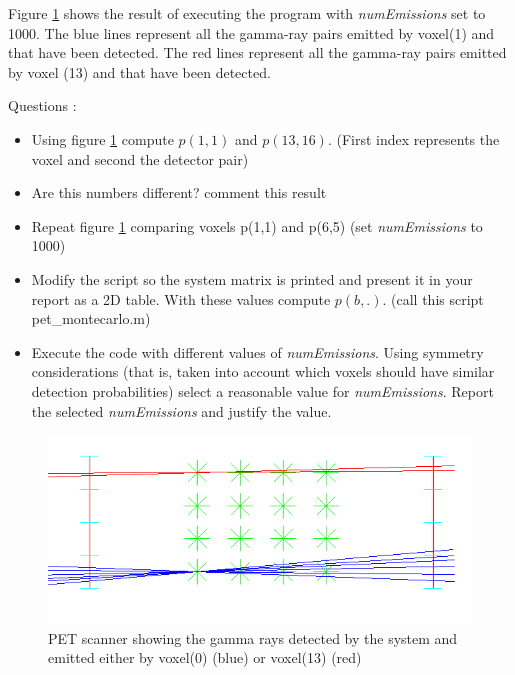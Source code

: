 \documentclass[12pt]{article} %
\newcounter{ejercicioNo}
\begin{document}
Figure \ref{fig:0_0vs0_3} shows the result of executing the program with \emph{numEmissions} set to 1000. The blue lines represent all the gamma-ray pairs emitted by voxel(1) and that have been detected. The red lines represent all the gamma-ray pairs emitted by voxel (13)  and that have been detected.\\

\begin{minipage}{\linewidth}
\begin{framed}
\addtocounter{ejercicioNo}{1} 
Questions : 
\begin{itemize}
   \item Using figure \ref{fig:0_0vs0_3} compute  $p(1,1)$ and $p(13,16)$. (First index represents the voxel and second the detector pair) 
   \item Are this numbers different? comment this result
   \item Repeat figure \ref{fig:0_0vs0_3} comparing voxels p(1,1) and p(6,5) (set \emph{numEmissions}  to 1000)
   \item Modify the script so the system matrix is printed and present it in your report as a 2D
   table. With these values compute $p(b,.)$. (call this script pet\_montecarlo.m)
   \item Execute the code with different values of \emph{numEmissions}. Using symmetry considerations
   (that is, taken into account which voxels  should have similar detection probabilities) select a reasonable value for \emph{numEmissions}. Report the selected \emph{numEmissions} and justify the value. 
\end{itemize}
\end{framed}
\end{minipage}

\begin{figure}[h]
\includegraphics{images/0_0vs0_3.png}
\caption{PET scanner showing the gamma rays detected by the system and
emitted either by voxel(0) (blue) or voxel(13) (red)  \label{fig:0_0vs0_3}}
\end{figure}
\end{document}
